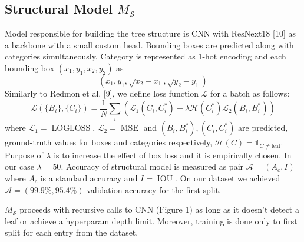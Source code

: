 \documentclass{sciposter}
\begin{document}
\begin{multicols}{3}
\subsection{Structural Model $M_{\mathcal{S}}$}
Model responsible for building the tree structure is CNN with ResNext18 [10] as a backbone with a small custom head. Bounding boxes are predicted along with categories simultaneously. Category is represented as 1-hot encoding and each bounding box $(x_1,y_1,x_2,y_2)$ as $$(x_1,y_1,\sqrt{x_2-x_1},\sqrt{y_2-y_1})$$
Similarly to Redmon et al. [9], we define loss function $\mathcal{L}$ for a batch as follows:
$$
 \mathcal{L} (\{B_i\}, \{C_i\}) = \frac{1}{N} \sum_i \left( \mathcal{L}_1(C_i, C_i^*) +  \lambda \mathcal{H}(C_i^*) \mathcal{L}_2(B_i, B_i^*)  \right)
$$
where $\mathcal{L}_1 = \operatorname{LOGLOSS}$, $\mathcal{L}_2 = \operatorname{MSE}$ and $(B_i, B_i^*), (C_i, C_i^*)$ are predicted, ground-truth values for boxes and categories respectively, $\mathcal{H}(C)=\mathds{1}_{C \neq \text{leaf}}$. Purpose of $\lambda$ is to increase the effect of box loss and it is empirically chosen. In our case $\lambda = 50$. Accuracy of structural model is measured as pair $\mathcal{A}=(A_c, I)$ where $A_c$ is a standard accuracy and $I=\operatorname{IOU}$. On our dataset we achieved $\mathcal{A}=(99.9\%,95.4\%)$ validation accuracy for the first split.

$M_{\mathcal{S}}$ proceeds with recursive calls to CNN (Figure 1) as long as it doesn't detect a leaf or achieve a hyperparam depth limit. Moreover, training is done only to first split for each entry from the dataset.


\end{multicols}
\end{document}
